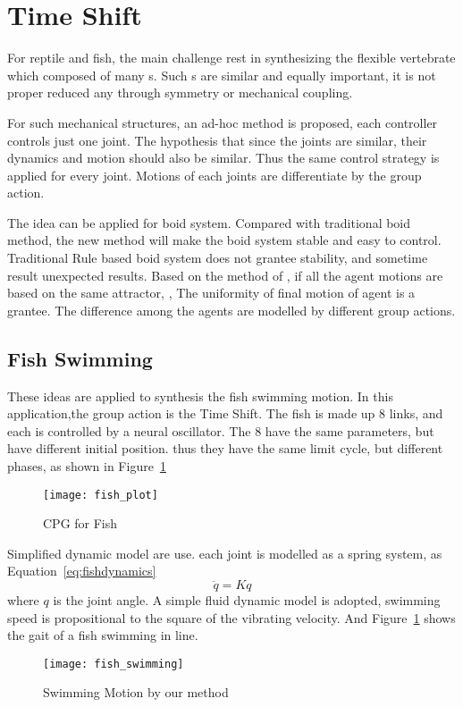 {\section{Time Shift}

For reptile and fish, the main challenge rest in synthesizing the flexible vertebrate which  composed of many {\dof}s.
Such {\dof}s are similar and equally important, it is not proper reduced any \dof through symmetry or mechanical coupling.

For such mechanical structures, an ad-hoc method is proposed, each controller controls just one joint.
The hypothesis that since the joints are similar, their dynamics and motion should also be similar.
Thus the same control strategy is applied for every joint.
Motions of each joints are differentiate by the group action.


The idea can be applied for boid system\citep{reynolds1987flocks}.
Compared with traditional boid method, the new method will make the boid system stable and easy to control.
Traditional Rule based boid system does not grantee stability, and sometime result unexpected results.
Based on the method of \moit, if all the agent motions are based on the same attractor, ,
The uniformity of final motion of agent is a grantee.
The difference  among the agents are modelled by different group actions.

\subsection*{Fish Swimming}
These ideas are applied to synthesis the fish swimming motion.
In this application,the group action is the Time Shift.
The fish is made up 8 links, and each {\dof} is controlled by a neural oscillator.
The $8$ \cpg have the same parameters, but have different initial position. thus they have the same limit cycle, but different phases, as shown in Figure~\ref{fig:fishplot}



\begin{figure}[!htbp]
  \begin{center}
      \texttt{[image: fish\_plot]}
    \caption{CPG for Fish}
    \label{fig:fishplot}
\end{center}
\end{figure}




Simplified dynamic model are use.
each joint is modelled as a spring system, as Equation~\ref{eq:fishdynamics}
\begin{equation}
\label{eq:fishdynamics}
\ddot{q}=Kq
\end{equation}
where $q$ is the joint angle.
A simple fluid dynamic model is adopted,  swimming speed is propositional to the square of the vibrating velocity.
And Figure~\ref{} shows the gait of a fish swimming in line.
\begin{figure}[!htbp]
  \begin{center}
      \texttt{[image: fish\_swimming]}
    \caption{Swimming Motion by our method}
    \label{fig:fishswimming}
\end{center}
\end{figure}


}
